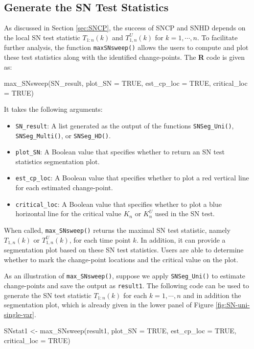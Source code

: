 \subsection{Generate the SN Test Statistics }\label{subsec:teststatistic}

As discussed in Section \ref{sec:SNCP}, the success of SNCP and SNHD depends on the local SN test statistic $T_{1:n}(k)$ and $T_{1,n}^U(k)$ for $k=1,\cdots,n$. To facilitate further analysis, the function \texttt{maxSNsweep()} allows the users to compute and plot these test statistics along with the identified change-points. The \textbf{R} code is given as:
\begin{example}
max_SNsweep(SN_result, plot_SN = TRUE, est_cp_loc = TRUE, critical_loc = TRUE)
\end{example}
It takes the following arguments:
\begin{itemize}
	\item \texttt{SN\_result}: A list generated as the output of the functions \texttt{SNSeg\_Uni()}, \texttt{SNSeg\_Multi()}, or \texttt{SNSeg\_HD()}.  
	\item \texttt{plot\_SN}: A Boolean value that specifies whether to return an SN test statistics segmentation plot.
	\item \texttt{est\_cp\_loc}: A Boolean value that specifies whether to plot a red vertical line for each estimated change-point.
	\item \texttt{critical\_loc}: A Boolean value that specifies whether to plot a blue horizontal line for the critical value $K_n$ or $K_n^U$ used in the SN test.
\end{itemize}
When called, \texttt{max\_SNsweep()} returns the maximal SN test statistic, namely $T_{1,n}(k)$ or $T_{1,n}^U(k)$, for each time point $k$. In addition, it can provide a segmentation plot based on these SN test statistics. Users are able to determine whether to mark the change-point locations and the critical value on the plot.

As an illustration of \texttt{max\_SNsweep()}, suppose we apply \texttt{SNSeg\_Uni()} to estimate change-points and save the output as \texttt{result1}. The following code can be used to generate the SN test statistic $T_{1:n}(k)$ for each $k=1,\cdots,n$ and in addition the segmentation plot, which is already given in the lower panel of Figure \ref{fig:SN-uni-single-var}.
\begin{example}
SNstat1 <- max_SNsweep(result1, plot_SN = TRUE, est_cp_loc = TRUE, critical_loc = TRUE)
\end{example}

